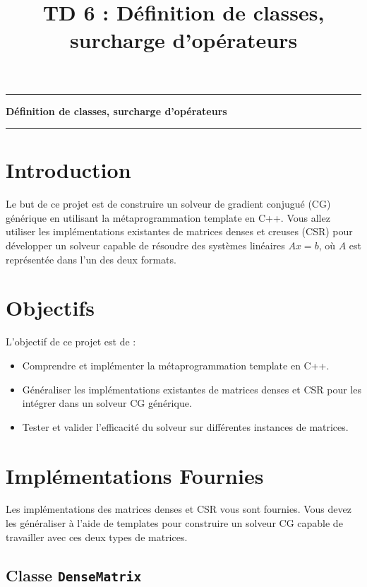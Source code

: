 \documentclass[a4paper,14pt]{article}
\title{TD 6 : Définition de classes, surcharge d'opérateurs}
\author{}
\date{}
\begin{document}
\hrule height 1pt
\vspace{0.1cm}
\noindent
{}
\begin{center}
{\Large \bf Définition de classes, surcharge d'opérateurs}
\end{center}
\hrule height 1pt
\vspace{0.5cm}



\section*{Introduction}

Le but de ce projet est de construire un solveur de gradient conjugué (CG) générique en utilisant la métaprogrammation template en C++. Vous allez utiliser les implémentations existantes de matrices denses et creuses (CSR) pour développer un solveur capable de résoudre des systèmes linéaires $Ax = b$, où $A$ est représentée dans l'un des deux formats.

\section*{Objectifs}

L'objectif de ce projet est de :
\begin{itemize}
    \item Comprendre et implémenter la métaprogrammation template en C++.
    \item Généraliser les implémentations existantes de matrices denses et CSR pour les intégrer dans un solveur CG générique.
    \item Tester et valider l'efficacité du solveur sur différentes instances de matrices.
\end{itemize}

\section*{Implémentations Fournies}

Les implémentations des matrices denses et CSR vous sont fournies. Vous devez les généraliser à l'aide de templates pour construire un solveur CG capable de travailler avec ces deux types de matrices.

\subsection*{Classe \texttt{DenseMatrix}}
\end{document}
